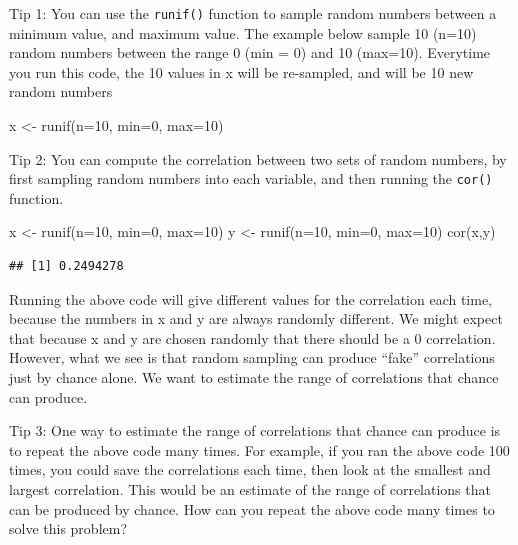 \documentclass[
]{book}
\newenvironment{Shaded}{\begin{snugshade}}{\end{snugshade}}
\newcommand{\AttributeTok}[1]{\textcolor[rgb]{0.77,0.63,0.00}{#1}}
\newcommand{\DecValTok}[1]{\textcolor[rgb]{0.00,0.00,0.81}{#1}}
\newcommand{\FunctionTok}[1]{\textcolor[rgb]{0.00,0.00,0.00}{#1}}
\newcommand{\NormalTok}[1]{#1}
\newcommand{\OtherTok}[1]{\textcolor[rgb]{0.56,0.35,0.01}{#1}}
\begin{document}
Tip 1: You can use the \texttt{runif()} function to sample random numbers between a minimum value, and maximum value. The example below sample 10 (n=10) random numbers between the range 0 (min = 0) and 10 (max=10). Everytime you run this code, the 10 values in x will be re-sampled, and will be 10 new random numbers

\begin{Shaded}
\begin{Highlighting}[]
\NormalTok{x }\OtherTok{\textless{}{-}} \FunctionTok{runif}\NormalTok{(}\AttributeTok{n=}\DecValTok{10}\NormalTok{, }\AttributeTok{min=}\DecValTok{0}\NormalTok{, }\AttributeTok{max=}\DecValTok{10}\NormalTok{)}
\end{Highlighting}
\end{Shaded}

Tip 2: You can compute the correlation between two sets of random numbers, by first sampling random numbers into each variable, and then running the \texttt{cor()} function.

\begin{Shaded}
\begin{Highlighting}[]
\NormalTok{x }\OtherTok{\textless{}{-}} \FunctionTok{runif}\NormalTok{(}\AttributeTok{n=}\DecValTok{10}\NormalTok{, }\AttributeTok{min=}\DecValTok{0}\NormalTok{, }\AttributeTok{max=}\DecValTok{10}\NormalTok{)}
\NormalTok{y }\OtherTok{\textless{}{-}} \FunctionTok{runif}\NormalTok{(}\AttributeTok{n=}\DecValTok{10}\NormalTok{, }\AttributeTok{min=}\DecValTok{0}\NormalTok{, }\AttributeTok{max=}\DecValTok{10}\NormalTok{)}
\FunctionTok{cor}\NormalTok{(x,y)}
\end{Highlighting}
\end{Shaded}

\begin{verbatim}
## [1] 0.2494278
\end{verbatim}

Running the above code will give different values for the correlation each time, because the numbers in x and y are always randomly different. We might expect that because x and y are chosen randomly that there should be a 0 correlation. However, what we see is that random sampling can produce ``fake'' correlations just by chance alone. We want to estimate the range of correlations that chance can produce.

Tip 3: One way to estimate the range of correlations that chance can produce is to repeat the above code many times. For example, if you ran the above code 100 times, you could save the correlations each time, then look at the smallest and largest correlation. This would be an estimate of the range of correlations that can be produced by chance. How can you repeat the above code many times to solve this problem?
\end{document}
